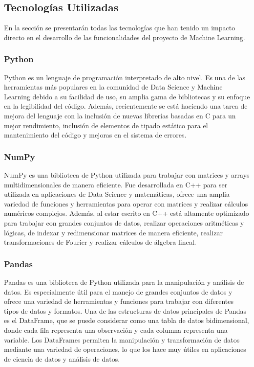 \subsection{Tecnologías Utilizadas}
En la sección se presentarán todas las tecnologías que han tenido un impacto directo en el desarrollo de las 
funcionalidades del proyecto de Machine Learning.

\subsubsection{Python}
Python es un lenguaje de programación interpretado de alto nivel. Es una de las herramientas más populares 
en la comunidad de Data Science y Machine Learning debido a su facilidad de uso, su amplia gama de bibliotecas 
y su enfoque en la legibilidad del código. Además, recientemente se está haciendo una tarea de mejora del 
lenguaje con la inclusión de nuevas librerías basadas en C para un mejor rendimiento, inclusión de elementos 
de tipado estático para el mantenimiento del código y mejoras en el sistema de errores.

\subsubsection{NumPy}
NumPy es una biblioteca de Python utilizada para trabajar con matrices y arrays multidimensionales de manera 
eficiente. Fue desarrollada en C++ para ser utilizada en aplicaciones de Data Science y matemáticas, ofrece 
una amplia variedad de funciones y herramientas para operar con matrices y realizar cálculos numéricos complejos. 
Además, al estar escrito en C++ está altamente optimizado para trabajar con grandes conjuntos de datos, realizar 
operaciones aritméticas y lógicas, de indexar y redimensionar matrices de manera eficiente, realizar transformaciones 
de Fourier y realizar cálculos de álgebra lineal.

\subsubsection{Pandas}
Pandas es una biblioteca de Python utilizada para la manipulación y análisis de datos. Es especialmente 
útil para el manejo de grandes conjuntos de datos y ofrece una variedad de herramientas y funciones para 
trabajar con diferentes tipos de datos y formatos. Una de las estructuras de datos principales de Pandas es 
el DataFrame, que se puede considerar como una tabla de datos bidimensional, donde cada fila representa una 
observación y cada columna representa una variable. Los DataFrames permiten la manipulación y transformación 
de datos mediante una variedad de operaciones, lo que los hace muy útiles en aplicaciones de ciencia de datos 
y análisis de datos. 

